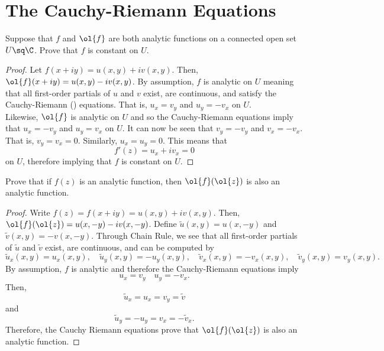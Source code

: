 \section{The Cauchy-Riemann Equations}

\begin{qualproblem}[Fall 2019.C6]
    Suppose that $f$ and $\ol{f}$ are both analytic functions on a connected open set $U \sq \C$. Prove that $f$ is constant on $U$.
\end{qualproblem}

\begin{proof}
    Let $f(x+iy) = u(x,y) + iv(x,y)$. Then, $\ol{f}(x + iy) = u(x,y) - iv(x,y)$. By assumption, $f$ is analytic on $U$ meaning that all first-order partials of $u$ and $v$ exist, are continuous, and satisfy the Cauchy-Riemann () equations. That is, $u_x = v_y$ and $u_y = -v_x$ on $U$.\\

    Likewise, $\ol{f}$ is analytic on $U$ and so the Cauchy-Riemann equations imply that $u_x = -v_y$ and $u_y = v_x$ on $U$. It can now be seen that $v_y = -v_y$ and $v_x = -v_x$. That is, $v_y = v_x = 0$. Similarly, $u_x = u_y = 0$. This means that
        \[f'(z) = u_x + iv_x = 0\]
    on $U$, therefore implying  that $f$ is constant on $U$.
\end{proof}

\begin{qualproblem}[Spring 2017.C6]
    Prove that if $f(z)$ is an analytic function, then $\ol{f}(\ol{z})$ is also an analytic function.
\end{qualproblem}

\begin{proof}
    Write $f(z) = f(x+iy) = u(x,y) + iv(x,y)$. Then, $\ol{f}(\ol{z}) = u(x,-y) - iv(x,-y)$. Define $\tilde{u}(x,y) = u(x,-y)$ and $\tilde{v}(x,y) = -v(x,-y)$. Through Chain Rule, we see that all first-order partials of $\tilde{u}$ and $\tilde{v}$ exist, are continuous, and can be computed by 
        \[\tilde{u}_x(x,y) = u_x(x,y), \quad \tilde{u}_y(x,y) = -u_y(x,y),
        \quad \tilde{v}_x(x,y) = -v_x(x,y), \quad \tilde{v}_y(x,y) = v_y(x,y).\]
    By assumption, $f$ is analytic and therefore the Cauchy-Riemann equations imply
        \[u_x = v_y \quad u_y = -v_x.\]
    Then,
        \[\tilde{u}_x = u_x = v_y = \tilde{v}\]
    and
        \[\tilde{u}_y = -u_y = v_x = -\tilde{v}_x.\]
    Therefore, the Cauchy Riemann equations prove that $\ol{f}(\ol{z})$ is also an analytic function.
\end{proof}